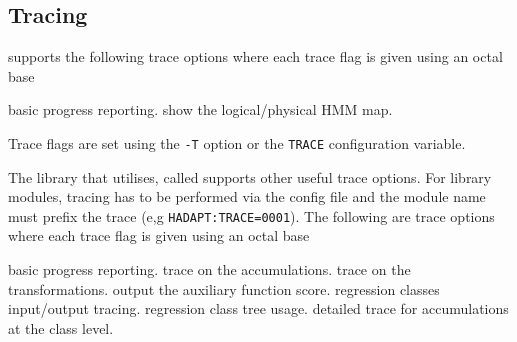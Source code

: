 \subsection{Tracing}

 supports the following trace options where each
trace flag is given using an octal base
\begin{optlist}
    basic progress reporting.
    show the logical/physical HMM map.
\end{optlist}

Trace flags are set using the \texttt{-T} option or the  \texttt{TRACE} 
configuration variable.

The library that  utilises, called  supports other
useful trace options. For library modules, tracing has to be performed via 
the config file and the module name must prefix the trace (e,g \texttt{HADAPT:TRACE=0001}). 
The following are  trace options
where each trace flag is given using an octal base
\begin{optlist}
    basic progress reporting.
    trace on the accumulations.
    trace on the transformations.
    output the auxiliary function score.
    regression classes input/output tracing.
    regression class tree usage.
    detailed trace for accumulations at the class level.
\end{optlist}


